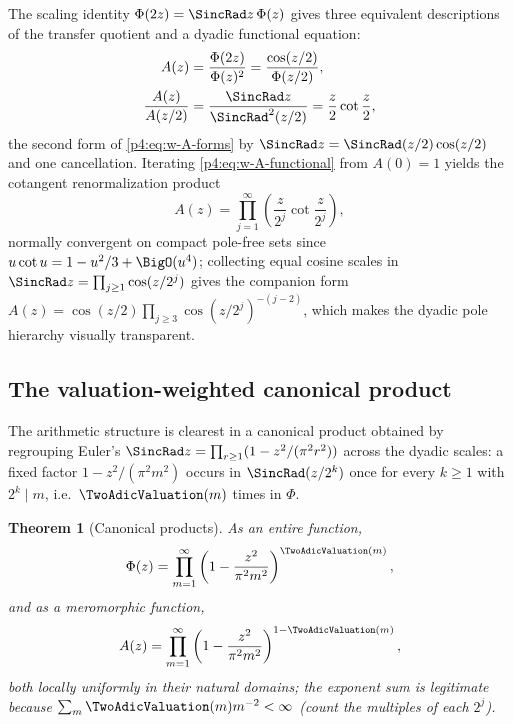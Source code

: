 \documentclass[11pt,oneside]{article}
\numberwithin{equation}{section}
\newtheorem{theorem}{Theorem}[section]
\theoremstyle{definition}
\theoremstyle{remark}
\begin{document}
The scaling identity $\Phi(2z)=\SincRad z\,\Phi(z)$ gives three equivalent
descriptions of the transfer quotient and a dyadic functional equation:
\begin{align}
 A(z)&=\frac{\Phi(2z)}{\Phi(z)^2}
      =\frac{\cos(z/2)}{\Phi(z/2)},
 \label{p4:eq:w-A-forms}\\
 \frac{A(z)}{A(z/2)}
 &=\frac{\SincRad z}{\SincRad^2(z/2)}
  =\frac z2\cot\frac z2,
 \label{p4:eq:w-A-functional}
\end{align}
the second form of \eqref{p4:eq:w-A-forms} by
$\SincRad z=\SincRad(z/2)\cos(z/2)$ and one cancellation.  Iterating
\eqref{p4:eq:w-A-functional} from $A(0)=1$ yields the cotangent
renormalization product
\begin{equation}
 A(z)=\prod_{j=1}^{\infty}
 \left(\frac{z}{2^j}\cot\frac{z}{2^j}\right),
 \label{p4:eq:w-cot-product}
\end{equation}
normally convergent on compact pole-free sets since
$u\cot u=1-u^2/3+\BigO(u^4)$; collecting equal cosine scales in
$\SincRad z=\prod_{j\ge1}\cos(z/2^j)$ gives the companion form
$A(z)=\cos(z/2)\prod_{j\ge3}\cos(z/2^j)^{-(j-2)}$, which makes the dyadic
pole hierarchy visually transparent.

\subsection{The valuation-weighted canonical product}

The arithmetic structure is clearest in a canonical product obtained by
regrouping Euler's $\SincRad z=\prod_{r\ge1}(1-z^2/(\pi^2r^2))$ across the
dyadic scales: a fixed factor $1-z^2/(\pi^2m^2)$ occurs in
$\SincRad(z/2^k)$ once for every $k\ge1$ with $2^k\mid m$, i.e.\ $\TwoAdicValuation(m)$
times in $\Phi$.

\begin{theorem}[Canonical products]
\label{p4:thm:w-canonical}
As an entire function,
\begin{equation}
 \Phi(z)=\prod_{m=1}^{\infty}
 \left(1-\frac{z^2}{\pi^2m^2}\right)^{\TwoAdicValuation(m)},
 \label{p4:eq:w-phi-canonical}
\end{equation}
and as a meromorphic function,
\begin{equation}
 A(z)=\prod_{m=1}^{\infty}
 \left(1-\frac{z^2}{\pi^2m^2}\right)^{1-\TwoAdicValuation(m)},
 \label{p4:eq:w-A-canonical}
\end{equation}
both locally uniformly in their natural domains; the exponent sum is
legitimate because
$\sum_m\TwoAdicValuation(m)m^{-2}<\infty$ (count the multiples of each $2^j$).
\end{theorem}
\end{document}
